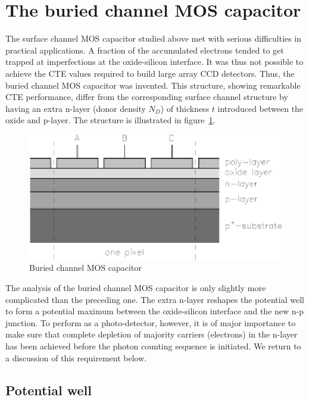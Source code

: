 \section{The buried channel MOS capacitor}

The surface channel MOS capacitor studied above met with serious
difficulties in practical applications. A fraction of the accumulated
electrons tended to get trapped at imperfections at the oxide-silicon
interface. It was thus not possible to achieve the CTE values required
to build large array CCD detectors. Thus, the buried channel MOS
capacitor was invented. This structure, showing remarkable CTE
performance, differ from the corresponding surface channel structure
by having an extra n-layer (donor density $N_D$) of thickness $t$
introduced between the oxide and p-layer. The structure is
illustrated in figure~\ref{CCD.fignMOS}.

\begin{figure}[h]
  \centering
	\includegraphics{CCD_nMOS.eps}
  \caption{Buried channel MOS capacitor}
  \label{CCD.fignMOS}
\end{figure}

The analysis of the buried channel MOS capacitor is only slightly more
complicated than the preceding one. The extra n-layer reshapes the
potential well to form a potential maximum between the oxide-silicon
interface and the new n-p junction. To perform as a photo-detector,
however, it is of major importance to make sure that complete
depletion of majority carriers (electrons) in the n-layer has been
achieved before the photon counting sequence is initiated. We return
to a discussion of this requirement below.

\subsection{Potential well}

